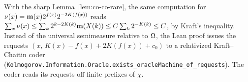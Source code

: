 \begin{formalization}
With the sharp Lemma~\ref{lem:co-co-rare}, the same computation for
\( \nu(x) = \mathbf{m}(x) 2^{f(x)} 2^{-2K(f(x))} \) reads
\( \sum_x \nu(x) \le \sum_k 2^{k - 2K(k)} \mathbf{m}(X(k)) \le C \sum_k 2^{-K(k)} \le C \),
by Kraft's inequality. Instead of the universal semimeasure relative to \( \Omega \), the Lean
proof issues the requests \( (x,\, K(x) - f(x) + 2K(f(x)) + c_0) \) to a relativized
Kraft--Chaitin coder (\texttt{Kolmogorov.Information.Oracle.exists\_oracleMachine\_of\_requests}).
The coder reads its requests off finite prefixes of \( \chi \).
\end{formalization}
